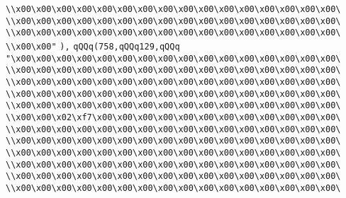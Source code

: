 \verb|\\x00\x00\x00\x00\x00\x00\x00\x00\x00\x00\x00\x00\x00\x00\x00\x00\|\newline
\verb|\\x00\x00\x00\x00\x00\x00\x00\x00\x00\x00\x00\x00\x00\x00\x00\x00\|\newline
\verb|\\x00\x00\x00\x00\x00\x00\x00\x00\x00\x00\x00\x00\x00\x00\x00\x00\|\newline
\verb|\\x00\x00"|\newline
\verb|),|\newline
\verb|qQQq(758,qQQq129,qQQq|\newline
\verb|"\x00\x00\x00\x00\x00\x00\x00\x00\x00\x00\x00\x00\x00\x00\x00\x00\|\newline
\verb|\\x00\x00\x00\x00\x00\x00\x00\x00\x00\x00\x00\x00\x00\x00\x00\x00\|\newline
\verb|\\x00\x00\x00\x00\x00\x00\x00\x00\x00\x00\x00\x00\x00\x00\x00\x00\|\newline
\verb|\\x00\x00\x00\x00\x00\x00\x00\x00\x00\x00\x00\x00\x00\x00\x00\x00\|\newline
\verb|\\x00\x00\x00\x00\x00\x00\x00\x00\x00\x00\x00\x00\x00\x00\x00\x00\|\newline
\verb|\\x00\x00\x02\xf7\x00\x00\x00\x00\x00\x00\x00\x00\x00\x00\x00\x00\|\newline
\verb|\\x00\x00\x00\x00\x00\x00\x00\x00\x00\x00\x00\x00\x00\x00\x00\x00\|\newline
\verb|\\x00\x00\x00\x00\x00\x00\x00\x00\x00\x00\x00\x00\x00\x00\x00\x00\|\newline
\verb|\\x00\x00\x00\x00\x00\x00\x00\x00\x00\x00\x00\x00\x00\x00\x00\x00\|\newline
\verb|\\x00\x00\x00\x00\x00\x00\x00\x00\x00\x00\x00\x00\x00\x00\x00\x00\|\newline
\verb|\\x00\x00\x00\x00\x00\x00\x00\x00\x00\x00\x00\x00\x00\x00\x00\x00\|\newline
\verb|\\x00\x00\x00\x00\x00\x00\x00\x00\x00\x00\x00\x00\x00\x00\x00\x00\|\newline
